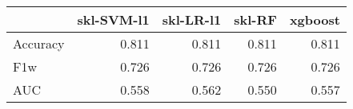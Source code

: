 \begin{tabular}{lrrrr}
\toprule
{} &  skl-SVM-l1 &  skl-LR-l1 &  skl-RF &  xgboost \\
\midrule
Accuracy &       0.811 &      0.811 &   0.811 &    0.811 \\
F1w      &       0.726 &      0.726 &   0.726 &    0.726 \\
AUC      &       0.558 &      0.562 &   0.550 &    0.557 \\
\bottomrule
\end{tabular}
